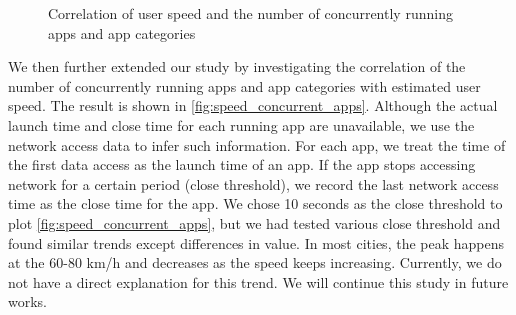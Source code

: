 \begin{figure}
    \centering
    \caption{Correlation of user speed and the number of concurrently running apps and app categories}
    \label{fig:speed_concurrent_apps}
\end{figure}

We then further extended our study by investigating the correlation of the number of concurrently running apps and app categories with estimated user speed. The result is shown in \autoref{fig:speed_concurrent_apps}. Although the actual launch time and close time for each running app are unavailable, we use the network access data to infer such information. For each app, we treat the time of the first data access as the launch time of an app. If the app stops accessing network for a certain period (close threshold), we record the last network access time as the close time for the app. We chose 10 seconds as the close threshold to plot \autoref{fig:speed_concurrent_apps}, but we had tested various close threshold and found similar trends except differences in value. In most cities, the peak happens at the 60-80 km/h and decreases as the speed keeps increasing. Currently, we do not have a direct explanation for this trend. We will continue this study in future works.

